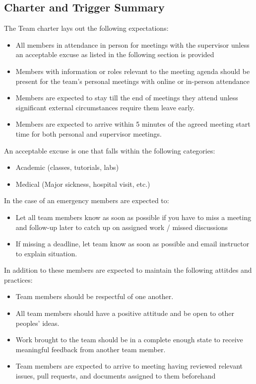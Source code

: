 \documentclass{article}
\begin{document}

\subsection{Charter and Trigger Summary}

The Team charter lays out the following expectations:

\begin{itemize}
\item All members in attendance in person for meetings with the supervisor unless an acceptable excuse as listed in the following section is provided
\item Members with information or roles relevant to the meeting agenda should be present for the team’s personal meetings with online or in-person attendance
\item Members are expected to stay till the end of meetings they attend unless significant external circumstances require them leave early. 
\item Members are expected to arrive within 5 minutes of the agreed meeting start time for both personal and supervisor meetings. 
\end{itemize}

An acceptable excuse is one that falls within the following categories:

\begin{itemize}
\item Academic (classes, tutorials, labs)
\item Medical (Major sickness, hospital visit, etc.)
\end{itemize}

In the case of an emergency members are expected to:

\begin{itemize}
\item Let all team members know as soon as possible if you have to miss a meeting and follow-up later to catch up on assigned work / missed discussions 
\item If missing a deadline, let team know as soon as possible and email instructor to explain situation.
\end{itemize}

In addition to these members are expected to maintain the following attitdes and practices:

\begin{itemize}
\item Team members should be respectful of one another.
\item All team members should have a positive attitude and be open to other peoples’ ideas. 
\item Work brought to the team should be in a complete enough state to receive meaningful feedback from another team member.
\item Team members are expected to arrive to meeting having reviewed relevant issues, pull requests, and documents assigned to them beforehand 
\end{itemize}
\end{document}
